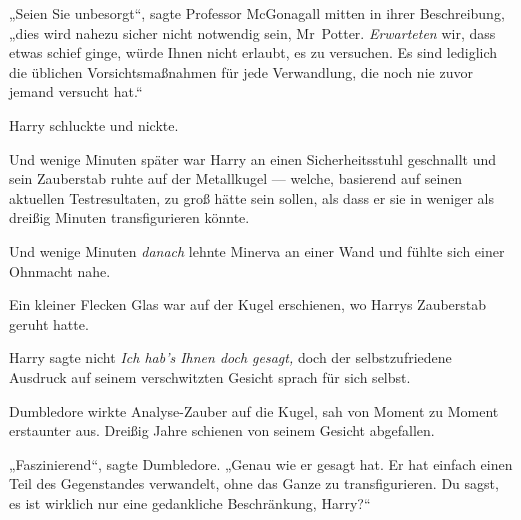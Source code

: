 „Seien Sie unbesorgt“, sagte Professor McGonagall mitten in ihrer Beschreibung, „dies wird nahezu sicher nicht notwendig sein, Mr~Potter. \emph{Erwarteten} wir, dass etwas schief ginge, würde Ihnen nicht erlaubt, es zu versuchen. Es sind lediglich die üblichen Vorsichtsmaßnahmen für jede Verwandlung, die noch nie zuvor jemand versucht hat.“

Harry schluckte und nickte.

Und wenige Minuten später war Harry an einen Sicherheitsstuhl geschnallt und sein Zauberstab ruhte auf der Metallkugel — welche, basierend auf seinen aktuellen Testresultaten, zu groß hätte sein sollen, als dass er sie in weniger als dreißig Minuten transfigurieren könnte.

Und wenige Minuten \emph{danach} lehnte Minerva an einer Wand und fühlte sich einer Ohnmacht nahe.

Ein kleiner Flecken Glas war auf der Kugel erschienen, wo Harrys Zauberstab geruht hatte.

Harry sagte nicht \emph{Ich hab’s Ihnen doch gesagt,} doch der selbstzufriedene Ausdruck auf seinem verschwitzten Gesicht sprach für sich selbst.

Dumbledore wirkte Analyse-Zauber auf die Kugel, sah von Moment zu Moment erstaunter aus. Dreißig Jahre schienen von seinem Gesicht abgefallen.

„Faszinierend“, sagte Dumbledore.
„Genau wie er gesagt hat. Er hat einfach einen Teil des Gegenstandes verwandelt, ohne das Ganze zu transfigurieren. Du sagst, es ist wirklich nur eine gedankliche Beschränkung, Harry?“


